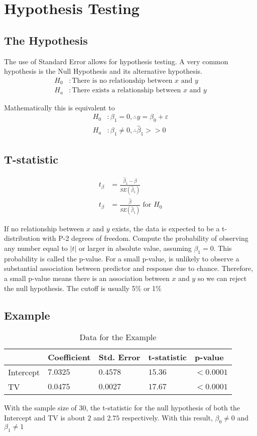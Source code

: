 \section{Hypothesis Testing}
\subsection{The Hypothesis}
The use of Standard Error allows for hypothesis testing. A very common hypothesis is the Null Hypothesis and its alternative hypothesis.
\begin{align*}
H_0 &:\text{There is no relationship between $x$ and $y$} \\
H_a &:\text{There exists a relationship between $x$ and $y$}
\end{align*}

Mathematically this is equivalent to
\begin{align*}
H_0 &:\beta_1=0, \therefore y=\beta_0+\varepsilon \\
H_a &:\beta_1\neq 0, \therefore \hat{\beta}_1>>0
\end{align*}

\subsection{T-statistic}
\begin{align*}
t_{\beta}&=\frac{\hat{\beta}_1-\beta}{SE\left(\hat{\beta}_1\right)} \\
t_{\beta}&=\frac{\hat{\beta}}{SE\left(\hat{\beta}_1\right)} \text{ for } H_0
\end{align*}

If no relationship between $x$ and $y$ exists, the data is expected to be a t-distribution with P-2 degrees of freedom.
Compute the probability of observing any number equal to $|t|$ or larger in absolute value, assuming $\beta_1=0$.
This probability is called the p-value.
For a small p-value, is unlikely to observe a substantial association between predictor and response due to chance.
Therefore, a small p-value means there is an association between $x$ and $y$ so we can reject the null hypothesis.
The cutoff is usually 5\% or 1\%

\subsection{Example}

\begin{table}[!ht]
\caption{Data for the Example}
\centering
\begin{tabular}{l|llll}
\hline
          & Coefficient & Std. Error & t-statistic & p-value    \\ \hline
Intercept & $7.0325$    & $0.4578$   & $15.36$     & $< 0.0001$ \\
TV        & $0.0475$    & $0.0027$   & $17.67$     & $< 0.0001$ \\ \hline
\end{tabular}
\end{table}

With the sample size of 30, the t-statistic for the null hypothesis of both the Intercept and TV is about $2$ and $2.75$ respectively.
With this result, $\beta_0\neq0$ and $\beta_1\neq1$